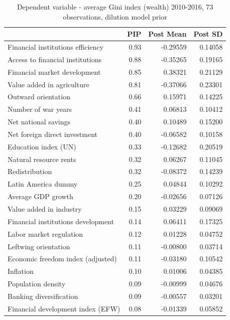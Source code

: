 \begin{refsection}
\begin{subappendices}
    \begin{table}[!ht]
    \footnotesize
    \centering
    \caption{Dependent variable - average Gini index (wealth) 2010-2016, 73 observations, dilution model prior}
    \label{ch3table:res3}
    \begin{tabular}{lrrr}
      \toprule
     & \ac{PIP} & Post Mean & Post SD \\ 
      \midrule
      Financial institutions efficiency & 0.93 & -0.29559 & 0.14058 \\ 
      Access to financial institutions & 0.88 & -0.35265 & 0.19165 \\ 
      Financial market development & 0.85 & 0.38321 & 0.21129 \\ 
      Value added in agriculture & 0.81 & -0.37066 & 0.23301 \\ 
      Outward orientation & 0.66 & 0.15971 & 0.14225 \\ 
      Number of war years & 0.41 & 0.06813 & 0.10412 \\ 
      Net national savings & 0.40 & 0.10489 & 0.15200 \\ 
      Net foreign direct investment & 0.40 & -0.06582 & 0.10158 \\ 
      Education index (UN) & 0.33 & -0.12682 & 0.20519 \\ 
      Natural resource rents & 0.32 & 0.06267 & 0.11045 \\ 
      Redistribution & 0.32 & -0.08372 & 0.14239 \\ 
      Latin America dummy & 0.25 & 0.04844 & 0.10292 \\ 
      Average GDP growth & 0.20 & -0.02656 & 0.07126 \\ 
      Value added in industry & 0.15 & 0.03229 & 0.09069 \\ 
      Financial institutions development & 0.14 & 0.06411 & 0.17325 \\ 
      Labor market regulation & 0.12 & 0.01228 & 0.04752 \\ 
      Leftwing orientation & 0.11 & -0.00800 & 0.03714 \\ 
      Economic freedom index (adjusted) & 0.11 & -0.03180 & 0.10542 \\ 
      Inflation & 0.10 & 0.01006 & 0.04385 \\ 
      Population density & 0.09 & -0.00999 & 0.04676 \\ 
      Banking diversification & 0.09 & -0.00557 & 0.03201 \\ 
      Financial development index (EFW) & 0.08 & -0.01339 & 0.05852 \\ 

\end{tabular}
\end{table}
\end{subappendices}
\end{refsection}
